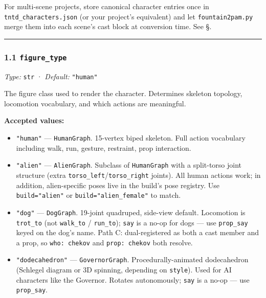 \documentclass[
  11pt,
]{book}
\providecommand{\tightlist}{%
  \setlength{\itemsep}{0pt}\setlength{\parskip}{0pt}}
\begin{document}
For multi-scene projects, store canonical character entries once in
\texttt{tntd\_characters.json} (or your project's equivalent) and let
\texttt{fountain2pam.py} merge them into each scene's cast block at
conversion time. See
\S \cite{field-precedence-and-the-canonical-registry}.%

\begin{center}\rule{0.5\linewidth}{0.5pt}\end{center}

\subsubsection{\texorpdfstring{1.1
\texttt{figure\_type}}{1.1 figure\_type}}\label{figure_type}

\emph{Type:} \texttt{str} · \emph{Default:} \texttt{"human"}

The figure class used to render the character. Determines skeleton
topology, locomotion vocabulary, and which actions are meaningful.

\textbf{Accepted values:}

\begin{itemize}
\tightlist
\item
  \texttt{"human"} --- \texttt{HumanGraph}. 15-vertex biped skeleton.
  Full action vocabulary including walk, run, gesture, restraint, prop
  interaction.
\item
  \texttt{"alien"} --- \texttt{AlienGraph}. Subclass of
  \texttt{HumanGraph} with a split-torso joint structure (extra
  \texttt{torso\_left}/\texttt{torso\_right} joints). All human actions
  work; in addition, alien-specific poses live in the build's pose
  registry. Use \texttt{build="alien"} or \texttt{build="alien\_female"}
  to match.
\item
  \texttt{"dog"} --- \texttt{DogGraph}. 19-joint quadruped, side-view
  default. Locomotion is \texttt{trot\_to} (not \texttt{walk\_to} /
  \texttt{run\_to}); \texttt{say} is a no-op for dogs --- use
  \texttt{prop\_say} keyed on the dog's name. Path C: dual-registered as
  both a cast member and a prop, so \texttt{who:\ chekov} and
  \texttt{prop:\ chekov} both resolve.
\item
  \texttt{"dodecahedron"} --- \texttt{GovernorGraph}.
  Procedurally-animated dodecahedron (Schlegel diagram or 3D spinning,
  depending on \texttt{style}). Used for AI characters like the
  Governor. Rotates autonomously; \texttt{say} is a no-op --- use
  \texttt{prop\_say}.
\end{itemize}
\end{document}

